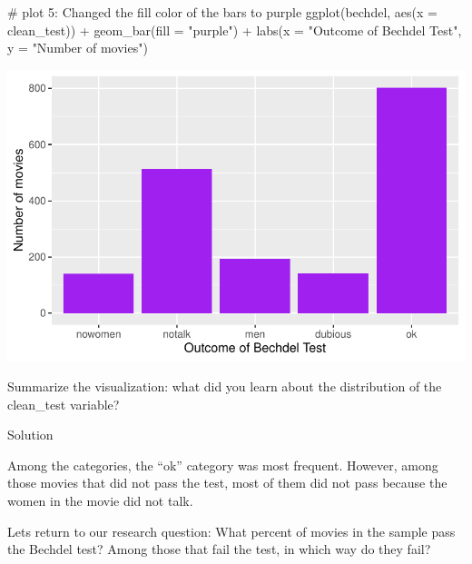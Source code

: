 \documentclass[
  letterpaper,
  DIV=11,
  numbers=noendperiod]{scrreprt}
\newenvironment{Shaded}{\begin{snugshade}}{\end{snugshade}}
\newcommand{\AttributeTok}[1]{\textcolor[rgb]{0.40,0.45,0.13}{#1}}
\newcommand{\CommentTok}[1]{\textcolor[rgb]{0.37,0.37,0.37}{#1}}
\newcommand{\FunctionTok}[1]{\textcolor[rgb]{0.28,0.35,0.67}{#1}}
\newcommand{\NormalTok}[1]{\textcolor[rgb]{0.00,0.23,0.31}{#1}}
\newcommand{\SpecialCharTok}[1]{\textcolor[rgb]{0.37,0.37,0.37}{#1}}
\newcommand{\StringTok}[1]{\textcolor[rgb]{0.13,0.47,0.30}{#1}}
\begin{document}
\begin{Shaded}
\begin{Highlighting}[]

\CommentTok{\# plot 5: Changed the fill  color of the bars to purple}
\FunctionTok{ggplot}\NormalTok{(bechdel, }\FunctionTok{aes}\NormalTok{(}\AttributeTok{x =}\NormalTok{ clean\_test)) }\SpecialCharTok{+}
\FunctionTok{geom\_bar}\NormalTok{(}\AttributeTok{fill =} \StringTok{"purple"}\NormalTok{) }\SpecialCharTok{+}
\FunctionTok{labs}\NormalTok{(}\AttributeTok{x =} \StringTok{"Outcome of Bechdel Test"}\NormalTok{, }\AttributeTok{y =} \StringTok{"Number of movies"}\NormalTok{)}
\end{Highlighting}
\end{Shaded}

\includegraphics{src/02-Intro_Data_Viz_files/figure-pdf/unnamed-chunk-19-5.pdf}

\hfill\break

\begin{Shaded}
\begin{Highlighting}[]
\NormalTok{Summarize the visualization: what did you learn about the distribution of the \textasciigrave{}clean\_test\textasciigrave{} variable?    }
\end{Highlighting}
\end{Shaded}

Solution

Among the categories, the ``ok'' category was most frequent. However,
among those movies that did not pass the test, most of them did not pass
because the women in the movie did not talk.

\hfill\break

\begin{Shaded}
\begin{Highlighting}[]
\NormalTok{Let\textquotesingle{}s return to our research question: What percent of movies in the sample pass the Bechdel test? Among those that fail the test, in which way do they fail? }
\end{Highlighting}
\end{Shaded}
\end{document}
